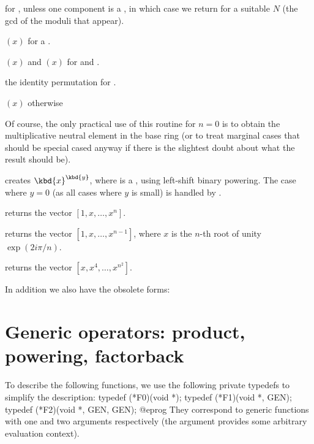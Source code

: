 \item {} for ,  unless one component
is a , in which case we return  for a suitable
$N$ (the gcd of the moduli that appear).

\item {}$(x)$ for a .

\item {}$(x)$ and $(x)$ for  and .

\item the identity permutation for .

\item {}$(x)$ otherwise

Of course, the only practical use of this routine for $n = 0$ is
to obtain the multiplicative neutral element in the base ring (or to treat
marginal cases that should be special cased anyway if there is the slightest
doubt about what the result should be).

 creates $\kbd{x}^{\kbd{y}}$, where  is a
, using left-shift binary powering. The case where $y = 0$
(as all cases where $y$ is small) is handled by .

 returns the vector $[1,x,\dots,x^n]$.

 returns the vector
$[1,x,\dots,x^{n-1}]$, where $x$ is the $n$-th root of unity $\exp(2i\pi/n)$.

 returns the vector $[x,x^4,\dots,x^{n^2}]$.

In addition we also have the obsolete forms:





\section{Generic operators: product, powering, factorback}

To describe the following functions, we use the following private typedefs
to simplify the description:
\bprog
  typedef (*F0)(void *);
  typedef (*F1)(void *, GEN);
  typedef (*F2)(void *, GEN, GEN);
@eprog
\noindent They correspond to generic functions with one and two arguments
respectively (the  argument provides some arbitrary evaluation
context).

